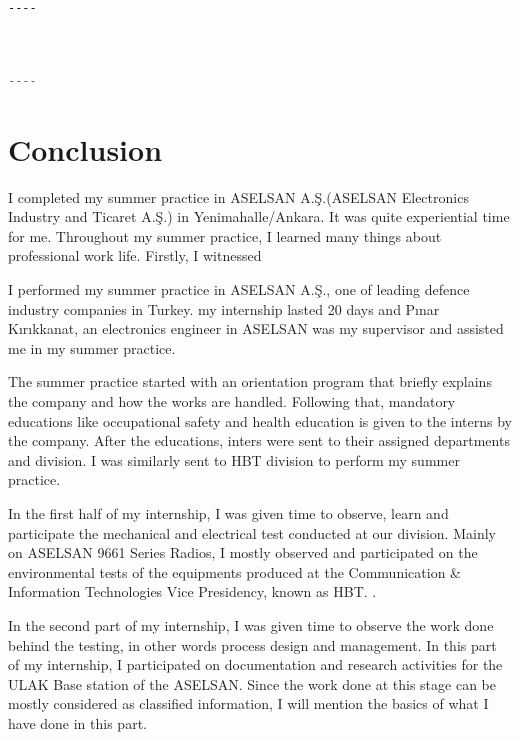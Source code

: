 	
\begin{lstlisting}[style=CStyle]


----


\end{lstlisting}

\vfill

\begin{lstlisting}[language=Matlab]

----

\end{lstlisting}

\vfill 

\section{Conclusion}

\-
\indent I completed my summer practice in ASELSAN A.Ş.(ASELSAN Electronics Industry and Ticaret A.Ş.) in Yenimahalle/Ankara. It was quite experiential time for me. Throughout my summer practice, I learned many things about professional work life. Firstly, I witnessed

\-\indent 
	I performed my summer practice in ASELSAN A.Ş., one of leading defence industry companies in Turkey. my internship lasted 20 days and Pınar Kırıkkanat, an electronics engineer in ASELSAN was my supervisor and assisted me in my summer practice.

	The summer practice started with an orientation program that briefly explains the company and how the works are handled. Following that, mandatory educations like occupational safety and health education is given to the interns by the company. After the educations, inters were sent to their assigned departments and division. I was similarly sent to HBT division to perform my summer practice.
	
	In the first half of my internship, I was given time to observe, learn and participate the mechanical and electrical test conducted at our division. Mainly on ASELSAN 9661 Series Radios, I mostly observed and participated on the environmental tests of the equipments produced at the Communication \& Information Technologies Vice Presidency, known as HBT. .
	
	In the second part of my internship, I was given time to observe the work done behind the testing, in other words process design and management. In this part of my internship, I participated on documentation and research activities for the ULAK Base station of the ASELSAN. Since the work done at this stage can be mostly considered as classified information, I will mention the basics of what I have done in this part.
	
